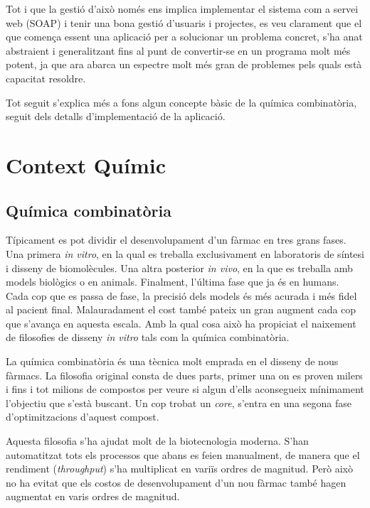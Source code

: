 	Tot i que la gestió d'això només ens implica implementar el sistema com a
	servei web (SOAP) i tenir una bona gestió d'usuaris i projectes, es veu
	clarament que el que comença essent una aplicació per a solucionar un
	problema concret, s'ha anat abstraient i generalitzant fins al punt de
	convertir-se en un programa molt més potent, ja que ara abarca un espectre
	molt més gran de problemes pels quals està capacitat resoldre.

	Tot seguit s'explica més a fons algun concepte bàsic de la química
	combinatòria, seguit dels detalls d'implementació de la aplicació.


\section{Context Químic} %
	\label{sec:Context Quimic}

	\subsection{Química combinatòria}
	Típicament es pot dividir el desenvolupament d'un fàrmac en tres grans
	fases. Una primera \emph{in vitro}, en la qual es treballa exclusivament en
	laboratoris de síntesi i disseny de biomolècules. Una altra posterior
	\emph{in vivo}, en la que es treballa amb models biològics o en animals.
	Finalment, l'última fase que ja és en humans. Cada cop que es passa de fase,
	la precisió dels models és més acurada i més fidel al pacient final.
	Malauradament el cost també pateix un gran augment cada cop que s'avança en
	aquesta escala. Amb la qual cosa això ha propiciat el naixement de
	filosofies de disseny \emph{in vitro} tals com la química combinatòria.

	La química combinatòria és una tècnica molt emprada en el disseny de nous
	fàrmacs. La filosofia original consta de dues parts, primer una on es proven
	milers i fins i tot milions de compostos per veure si algun d'ells
	aconsegueix mínimament l'objectiu que s'està buscant. Un cop trobat un
	\emph{core}, s'entra en una segona fase d'optimitzacions d'aquest compost.

	Aquesta filosofia s'ha ajudat molt de la biotecnologia moderna. S'han
	automatitzat tots els processos que abans es feien manualment, de manera que
	el rendiment (\emph{throughput}) s'ha multiplicat en variïs ordres de
	magnitud. Però això no ha evitat que els costos de desenvolupament d'un nou
	fàrmac també hagen augmentat en varis ordres de magnitud.

